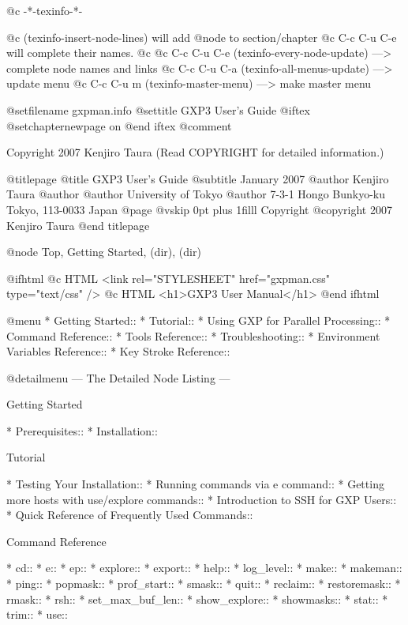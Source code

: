   @c -*-texinfo-*-

@c (texinfo-insert-node-lines) will add @node to section/chapter
@c C-c C-u C-e will complete their names.
@c 
@c C-c C-u C-e  (texinfo-every-node-update) ---> complete node names and links
@c C-c C-u C-a  (texinfo-all-menus-update)  ---> update menu
@c C-c C-u m    (texinfo-master-menu)       ---> make master menu

@setfilename gxpman.info
@settitle GXP3 User's Guide
@iftex
@setchapternewpage on
@end iftex
@comment %


Copyright 2007 Kenjiro Taura (Read COPYRIGHT for detailed information.)


@titlepage
@title GXP3 User's Guide
@subtitle January 2007
@author Kenjiro Taura
@author
@author University of Tokyo
@author 7-3-1 Hongo Bunkyo-ku Tokyo, 113-0033 Japan
@page
@vskip 0pt plus 1filll
Copyright @copyright{} 2007 Kenjiro Taura
@end titlepage

@node Top, Getting Started, (dir), (dir)

@ifhtml
@c HTML <link rel="STYLESHEET" href="gxpman.css" type="text/css" />
@c HTML <h1>GXP3 User Manual</h1>
@end ifhtml

@menu
* Getting Started::             
* Tutorial::                    
* Using GXP for Parallel Processing::  
* Command Reference::           
* Tools Reference::             
* Troubleshooting::             
* Environment Variables Reference::  
* Key Stroke Reference::        

@detailmenu
 --- The Detailed Node Listing ---

Getting Started

* Prerequisites::               
* Installation::                

Tutorial

* Testing Your Installation::   
* Running commands via e command::  
* Getting more hosts with use/explore commands::  
* Introduction to SSH for GXP Users::  
* Quick Reference of Frequently Used Commands::  

Command Reference

* cd::                          
* e::                           
* ep::                          
* explore::                     
* export::                      
* help::                        
* log_level::                   
* make::                        
* makeman::                     
* ping::                        
* popmask::                     
* prof_start::                  
* smask::                       
* quit::                        
* reclaim::                     
* restoremask::                 
* rmask::                       
* rsh::                         
* set_max_buf_len::             
* show_explore::                
* showmasks::                   
* stat::                        
* trim::                        
* use::                         


